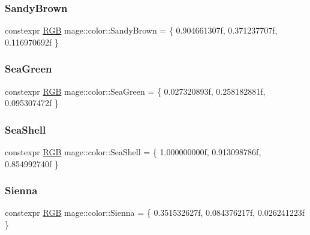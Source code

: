 \hypertarget{namespacemage_1_1color_a60814a5e21ce5f83b39a68435307ebac}{}\label{namespacemage_1_1color_a60814a5e21ce5f83b39a68435307ebac} 
\subsubsection{\texorpdfstring{Sandy\+Brown}{SandyBrown}}
{\footnotesize\ttfamily constexpr \hyperlink{structmage_1_1_r_g_b}{R\+GB} mage\+::color\+::\+Sandy\+Brown = \{ 0.\+904661307f, 0.\+371237707f, 0.\+116970692f \}}

\hypertarget{namespacemage_1_1color_a20147160d6224370ec0022225c7b1b3f}{}\label{namespacemage_1_1color_a20147160d6224370ec0022225c7b1b3f} 
\subsubsection{\texorpdfstring{Sea\+Green}{SeaGreen}}
{\footnotesize\ttfamily constexpr \hyperlink{structmage_1_1_r_g_b}{R\+GB} mage\+::color\+::\+Sea\+Green = \{ 0.\+027320893f, 0.\+258182881f, 0.\+095307472f \}}

\hypertarget{namespacemage_1_1color_aa47be4b4b7553ee872d5593ce4312249}{}\label{namespacemage_1_1color_aa47be4b4b7553ee872d5593ce4312249} 
\subsubsection{\texorpdfstring{Sea\+Shell}{SeaShell}}
{\footnotesize\ttfamily constexpr \hyperlink{structmage_1_1_r_g_b}{R\+GB} mage\+::color\+::\+Sea\+Shell = \{ 1.\+000000000f, 0.\+913098786f, 0.\+854992740f \}}

\hypertarget{namespacemage_1_1color_a5a0af07311915c908bfec906f104ce21}{}\label{namespacemage_1_1color_a5a0af07311915c908bfec906f104ce21} 
\subsubsection{\texorpdfstring{Sienna}{Sienna}}
{\footnotesize\ttfamily constexpr \hyperlink{structmage_1_1_r_g_b}{R\+GB} mage\+::color\+::\+Sienna = \{ 0.\+351532627f, 0.\+084376217f, 0.\+026241223f \}}

